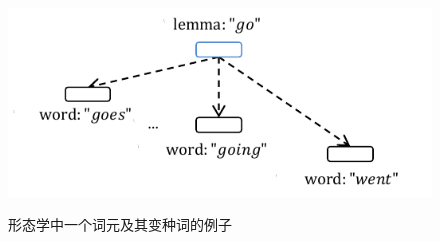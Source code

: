 \documentclass[master]{njuthesis}
\begin{document}
\begin{figure}[htbp]
  \centering
  \includegraphics[width= 1.0\textwidth]{figures//lemma_word_chap4.pdf}\\
  \caption{形态学中一个词元及其变种词的例子}\label{fig:lemma_word_chap4}
\end{figure}
\end{document}
